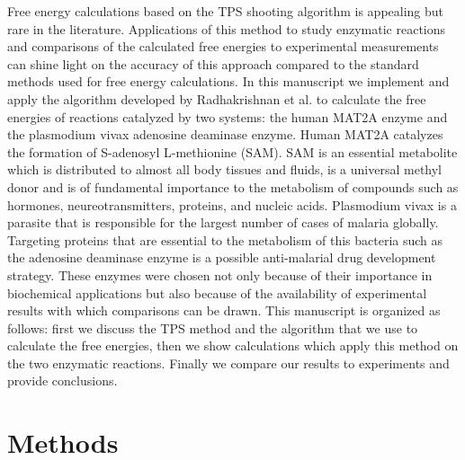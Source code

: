 \documentclass[journal=jpcbfk,manuscript=article,layout=traditional]{achemso}
\begin{document}
Free energy calculations based on the TPS shooting algorithm is 
appealing but rare in the literature. Applications of this 
method to study enzymatic reactions and comparisons of the calculated 
free energies to experimental measurements can shine light on the 
accuracy of this approach compared to the standard methods used for 
free energy calculations.    
In this manuscript we implement and apply the 
algorithm developed by Radhakrishnan et al. \cite{Radhakrishnan04JChemPhys121p2436} 
to calculate the free energies of reactions catalyzed by two systems:
the human MAT2A enzyme and the plasmodium vivax adenosine deaminase 
enzyme. \cite{Luo07JAmChemSoc129p8008,Ho09Biochemistry48p9618}
Human MAT2A catalyzes the formation of S-adenosyl L-methionine (SAM).
SAM is an essential metabolite which is 
distributed to almost all body tissues and fluids, is a universal 
methyl donor and is of fundamental importance to the metabolism of 
compounds such as hormones, neureotransmitters, proteins, 
and nucleic acids. \cite{Friedel89Drugs38p389}
Plasmodium vivax is a parasite that is responsible for the largest number 
of cases of malaria globally. Targeting proteins that are essential to
the metabolism of this bacteria such as the adenosine deaminase enzyme 
is a possible anti-malarial drug development strategy. \cite{Madrid08JBiolChem283p35899} 
These enzymes were chosen not only because of their importance in 
biochemical applications but also because of the availability of experimental 
results with which comparisons can be drawn. This manuscript is organized as 
follows: first we discuss the TPS method and the algorithm that we use 
to calculate the free energies, then we show calculations which apply this 
method on the two enzymatic reactions. Finally we compare our results to experiments
and provide conclusions. 
\section{Methods}
\end{document}
